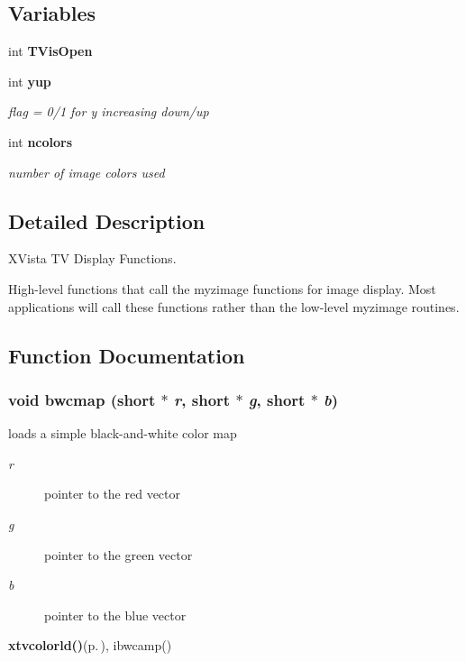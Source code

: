 \subsection*{Variables}
\begin{CompactItemize}
\item 
int {\bf TVis\-Open}\label{xtv_8c_a0}

\item 
int {\bf yup}\label{xtv_8c_a1}

\begin{CompactList}\small\item\em flag = 0/1 for y increasing down/up \item\end{CompactList}\item 
int {\bf ncolors}\label{xtv_8c_a2}

\begin{CompactList}\small\item\em number of image colors used \item\end{CompactList}\end{CompactItemize}


\subsection{Detailed Description}
XVista TV Display Functions. 

High-level functions that call the myzimage functions for image display. Most applications will call these functions rather than the low-level myzimage routines.

\subsection{Function Documentation}
\subsubsection{\setlength{\rightskip}{0pt plus 5cm}void bwcmap (short $\ast$ {\em r}, short $\ast$ {\em g}, short $\ast$ {\em b})}\label{xtv_8c_a7}


loads a simple black-and-white color map 

\begin{Desc}
\item[Parameters:]
\begin{description}
\item[{\em r}]pointer to the red vector \item[{\em g}]pointer to the green vector \item[{\em b}]pointer to the blue vector\end{description}
\end{Desc}
\begin{Desc}
\item[See also:]{\bf xtvcolorld()}{\rm (p.\,\pageref{xtv_8c_a6})}, ibwcamp() \end{Desc}
